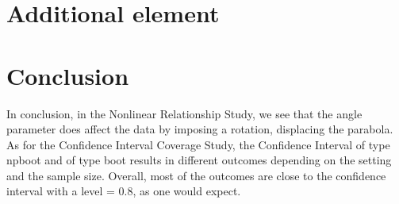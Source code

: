 \documentclass[11pt,]{article}
\begin{document}
\hypertarget{additional-element}{%
\section{Additional element}\label{additional-element}}

\hypertarget{conclusion}{%
\section{Conclusion}\label{conclusion}}

In conclusion, in the Nonlinear Relationship Study, we see that the
angle parameter does affect the data by imposing a rotation, displacing
the parabola. As for the Confidence Interval Coverage Study, the
Confidence Interval of type npboot and of type boot results in different
outcomes depending on the setting and the sample size. Overall, most of
the outcomes are close to the confidence interval with a level = 0.8, as
one would expect.
\end{document}
